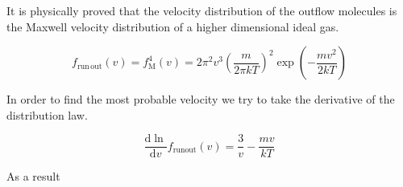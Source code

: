 \documentclass[a4paper,11pt]{amsart}
\theoremstyle{definition}
\begin{document}
	It is physically proved that the velocity distribution of the outflow molecules is the Maxwell velocity distribution of a higher dimensional ideal gas.

	$$
	f_{\mathrm{run}\,\mathrm{out}}\left( v \right) =f_{\mathrm{M}}^{4}\left( v \right) =2\pi ^2v^3\left( \frac{m}{2\pi kT} \right) ^2\exp \left( -\frac{mv^2}{2kT} \right) 
	$$

	In order to find the most probable velocity we try to take the derivative of the distribution law.

	$$
	\frac{\mathrm{d}\ln}{\mathrm{d}v}f_{\mathrm{run} \mathrm{out}}\left( v \right) =\frac{3}{v}-\frac{mv}{kT}
	$$

	As a result

	$$

	$$
	
\end{document}
